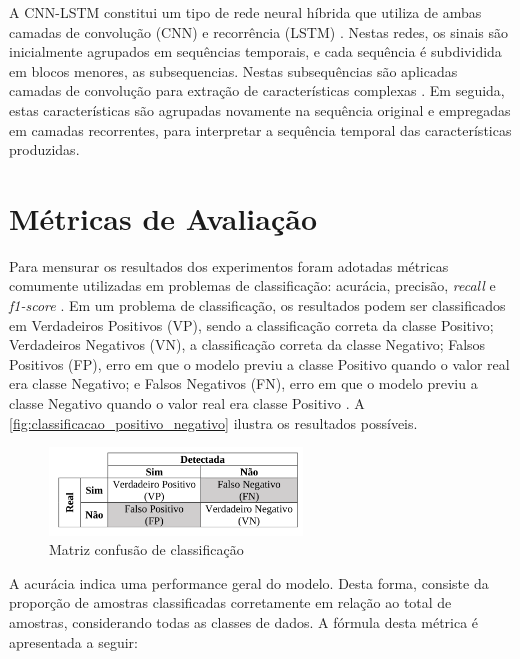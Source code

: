 A CNN-LSTM constitui um tipo de rede neural híbrida que utiliza de ambas camadas de convolução (CNN) e recorrência (LSTM) \cite{Deep2019}. Nestas redes, os sinais são inicialmente agrupados em sequências temporais, e cada sequência é subdividida em blocos menores, as subsequencias. Nestas subsequências são aplicadas camadas de convolução para extração de características complexas \cite{Deep2019}. Em seguida, estas características são agrupadas novamente na sequência original e empregadas em camadas recorrentes, para interpretar a sequência temporal das características produzidas.

\section{Métricas de Avaliação}

Para mensurar os resultados dos experimentos foram adotadas métricas comumente utilizadas em problemas de classificação: acurácia, precisão, \textit{recall} e \textit{f1-score} \cite{Rodrigues2020,Rodrigues2021,Shung2020}. Em um problema de classificação, os resultados podem ser classificados em Verdadeiros Positivos (VP), sendo a classificação correta da classe Positivo; Verdadeiros Negativos (VN), a classificação correta da classe Negativo; Falsos Positivos (FP), erro em que o modelo previu a classe Positivo quando o valor real era classe Negativo; e Falsos Negativos (FN), erro em que o modelo previu a classe Negativo quando o valor real era classe Positivo \cite{Rodrigues2020}. A \autoref{fig:classificacao_positivo_negativo} ilustra os resultados possíveis.

\begin{figure}[h]
  \centering
  \caption{Matriz confusão de classificação}
   \label{fig:classificacao_positivo_negativo}
   \includegraphics[width=0.6\textwidth]{figuras/fig_13.png}
\end{figure}

A acurácia indica uma performance geral do modelo. Desta forma, consiste da proporção de amostras classificadas corretamente em relação ao total de amostras, considerando todas as classes de dados. A fórmula desta métrica é apresentada a seguir:

